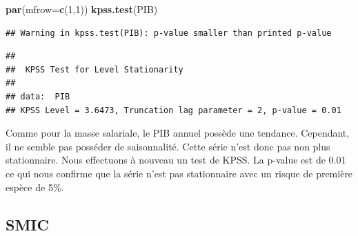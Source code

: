 \documentclass[11pt,]{article}
\newenvironment{Shaded}{\begin{snugshade}}{\end{snugshade}}
\newcommand{\KeywordTok}[1]{\textcolor[rgb]{0.13,0.29,0.53}{\textbf{{#1}}}}
\newcommand{\DataTypeTok}[1]{\textcolor[rgb]{0.13,0.29,0.53}{{#1}}}
\newcommand{\DecValTok}[1]{\textcolor[rgb]{0.00,0.00,0.81}{{#1}}}
\newcommand{\StringTok}[1]{\textcolor[rgb]{0.31,0.60,0.02}{{#1}}}
\newcommand{\NormalTok}[1]{{#1}}
\begin{document}
\begin{Shaded}
\begin{Highlighting}[]
  \KeywordTok{par}\NormalTok{(}\DataTypeTok{mfrow=}\KeywordTok{c}\NormalTok{(}\DecValTok{1}\NormalTok{,}\DecValTok{1}\NormalTok{))}
  \KeywordTok{kpss.test}\NormalTok{(PIB)}
\end{Highlighting}
\end{Shaded}

\begin{verbatim}
## Warning in kpss.test(PIB): p-value smaller than printed p-value
\end{verbatim}

\begin{verbatim}
## 
##  KPSS Test for Level Stationarity
## 
## data:  PIB
## KPSS Level = 3.6473, Truncation lag parameter = 2, p-value = 0.01
\end{verbatim}

Comme pour la masse salariale, le PIB annuel possède une tendance.
Cependant, il ne semble pas posséder de saisonnalité. Cette série n'est
donc pas non plus stationnaire. Nous effectuons à nouveau un test de
KPSS. La p-value est de 0.01 ce qui nous confirme que la série n'est pas
stationnaire avec un risque de première espèce de 5\%.

\subsection{SMIC}\label{smic}

\begin{Shaded}
\end{Shaded}
\end{document}
